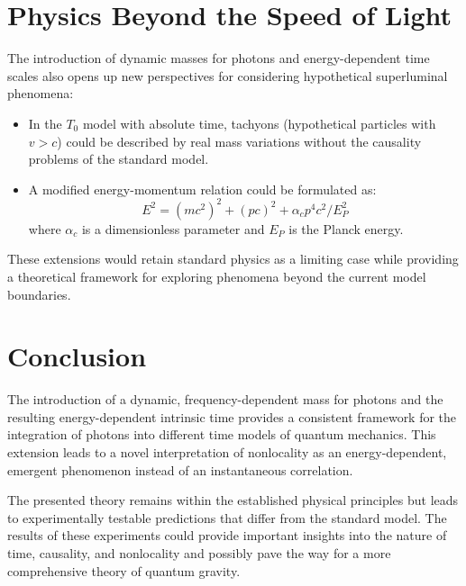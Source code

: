 \documentclass[a4paper,12pt]{article}
\begin{document}
	\section{Physics Beyond the Speed of Light}
	The introduction of dynamic masses for photons and energy-dependent time scales also opens up new perspectives for considering hypothetical superluminal phenomena:
	
	\begin{itemize}
		\item In the $T_0$ model with absolute time, tachyons (hypothetical particles with $v > c$) could be described by real mass variations without the causality problems of the standard model.
		
		\item A modified energy-momentum relation could be formulated as:
		\begin{equation}
			E^2 = (mc^2)^2 + (pc)^2 + \alpha_c p^4 c^2 / E_P^2
		\end{equation}
		where $\alpha_c$ is a dimensionless parameter and $E_P$ is the Planck energy.
	\end{itemize}
	
	These extensions would retain standard physics as a limiting case while providing a theoretical framework for exploring phenomena beyond the current model boundaries.
	
	\section{Conclusion}
	The introduction of a dynamic, frequency-dependent mass for photons and the resulting energy-dependent intrinsic time provides a consistent framework for the integration of photons into different time models of quantum mechanics. This extension leads to a novel interpretation of nonlocality as an energy-dependent, emergent phenomenon instead of an instantaneous correlation.
	
	The presented theory remains within the established physical principles but leads to experimentally testable predictions that differ from the standard model. The results of these experiments could provide important insights into the nature of time, causality, and nonlocality and possibly pave the way for a more comprehensive theory of quantum gravity.
	
\end{document}
